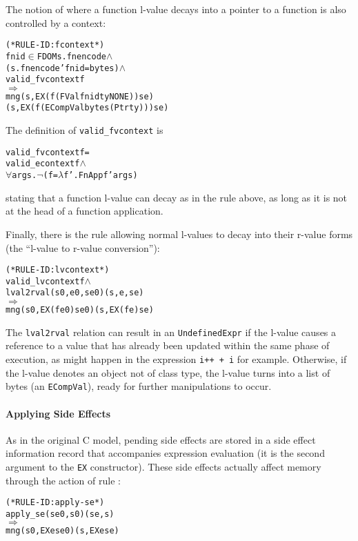 \documentclass[11pt]{article}
\begin{document}
The notion of where a function l-value decays into a pointer to a
function is also controlled by a context:
%
\begin{alltt}
(* RULE-ID: fcontext *)
     fnid \(\in\) FDOM s.fnencode \(\land\)
     (s.fnencode ' fnid = bytes) \(\land\)
     valid_fvcontext f
   \(\Rightarrow\)
     mng (s, EX (f (FVal fnid ty NONE)) se)
         (s, EX (f (ECompVal bytes (Ptr ty))) se)
\end{alltt}
The definition of \texttt{valid_fvcontext} is
\begin{alltt}
   valid_fvcontext f =
      valid_econtext f \(\land\)
      \(\forall\)args. \(\neg\)(f = \(\lambda\)f'. FnApp f' args)
\end{alltt}
stating that a function l-value can decay as in the rule above, as
long as it is not at the head of a function application.

%
%
Finally, there is the rule allowing normal l-values to decay into
their r-value forms (the ``l-value to r-value conversion''):
%
\begin{alltt}
(* RULE-ID: lvcontext *)
     valid_lvcontext f \(\land\)
     lval2rval (s0,e0,se0) (s,e,se)
   \(\Rightarrow\)
     mng (s0, EX (f e0) se0) (s, EX (f e) se)
\end{alltt}
The \texttt{lval2rval} relation can result in an
\texttt{UndefinedExpr} if the l-value causes a reference to a value
that has already been updated within the same phase of execution, as
might happen in the expression \texttt{i++ + i} for example.
Otherwise, if the l-value denotes an object not of class type, the
l-value turns into a list of bytes (an \texttt{ECompVal}), ready for
further manipulations to occur.

\paragraph{Applying Side Effects}
As in the original C model, pending side effects are stored in a side
effect information record that accompanies expression evaluation (it
is the second argument to the \texttt{EX} constructor).  These side
effects actually affect memory through the action of rule
:
%
\begin{alltt}
(* RULE-ID: apply-se *)
     apply_se (se0, s0) (se, s)
   \(\Rightarrow\)
     mng (s0, EX e se0) (s, EX e se)
\end{alltt}
\end{document}
